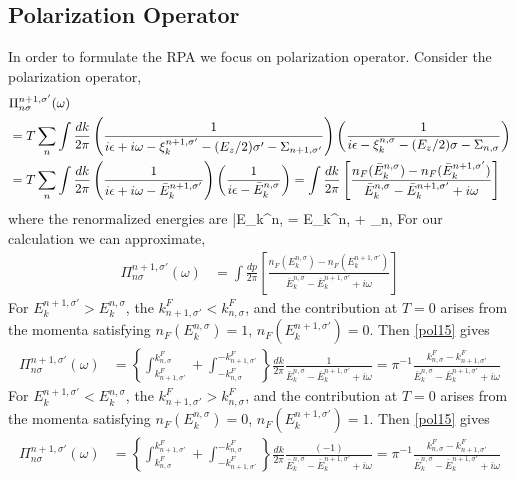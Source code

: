 \subsection{Polarization Operator}
In order to formulate the RPA we focus on polarization operator.
Consider the polarization operator,
\begin{align}\label{pol11}
&\Pi_{n\sigma}^{n+1,\sigma'}(\omega)\\
&= T \sum_n \int \frac{dk}{2 \pi}\left(\frac{ 1 }{ i \epsilon + i \omega - \xi_k^{n+1,\sigma'}- (E_z/2) \sigma'  - \Sigma_{n+1,\sigma'} } \right) 
\left(
\frac{ 1 }{ i \epsilon  - \xi_k^{n,\sigma} - (E_z/2) \sigma - \Sigma_{n,\sigma}} 
\right)
\notag \\
& = 
T \sum_n \int \frac{dk}{2 \pi}\left(\frac{ 1 }{ i \epsilon + i \omega - \bar{E}_k^{n+1,\sigma'}} \right) 
\left(
\frac{ 1 }{ i \epsilon  - \bar{E}_k^{n,\sigma} } 
\right)
=
\int \frac{ d k }{ 2 \pi } 
\left[
\frac{n_F(\bar{E}_k^{n,\sigma}) - n_F(\bar{E}_k^{n+1,\sigma'})  }{\bar{E}_k^{n,\sigma} - \bar{E}_k^{n+1,\sigma'} + i \omega }
\right]
\end{align}
where the renormalized energies are
\be\label{pol13}
\bar{E}_k^{n,\sigma}  = E_k^{n,\sigma}  + \Sigma_{n,\sigma}
\ee 
For our calculation we can approximate,
\begin{align}\label{pol15}
\Pi_{n\sigma}^{n+1,\sigma'}(\omega) &= 
\int \frac{ d p }{ 2 \pi } 
\left[
\frac{n_F(E_k^{n,\sigma}) - n_F(E_k^{n+1,\sigma'})  }{\bar{E}_k^{n,\sigma} - \bar{E}_k^{n+1,\sigma'} + i \omega }
\right]
\end{align}
For $E_k^{n+1,\sigma'} > E_k^{n,\sigma}$, the $k^F_{n+1,\sigma'} < k^F_{n,\sigma}$, and the contribution at $T=0$ arises from the momenta satisfying $n_F(E_k^{n,\sigma}) =1$, $n_F(E_k^{n+1,\sigma'})=0$.
Then \eqref{pol15} gives
\begin{align}\label{pol17}
\Pi_{n\sigma}^{n+1,\sigma'}(\omega) &=
\left\{ \int_{k^F_{n+1,\sigma'} }^{ k^F_{n,\sigma}}  + \int_{-k^F_{n,\sigma} }^{ -k^F_{n+1,\sigma'}} \right\} \frac{ d k }{ 2 \pi }
\frac{ 1 }{ \bar{E}_k^{n,\sigma}- \bar{E}_k^{n+1,\sigma'}   + i \omega}=
%
\pi^{-1} \frac{ k^F_{n,\sigma} - k^F_{n+1,\sigma'} }{ \bar{E}_k^{n,\sigma}- \bar{E}_k^{n+1,\sigma'}   + i \omega}
\end{align}
For $E_k^{n+1,\sigma'} < E_k^{n,\sigma}$, the $k^F_{n+1,\sigma'} > k^F_{n,\sigma}$, and the contribution at $T=0$ arises from the momenta satisfying $n_F(E_k^{n,\sigma}) =0$, $n_F(E_k^{n+1,\sigma'})=1$.
Then \eqref{pol15} gives
\begin{align}\label{pol19}
\Pi_{n\sigma}^{n+1,\sigma'}(\omega) &=
\left\{ \int_{ k^F_{n,\sigma}}^{k^F_{n+1,\sigma'} }  + \int_{ -k^F_{n+1,\sigma'}}^{-k^F_{n,\sigma} } \right\} \frac{ d k }{ 2 \pi }
\frac{ (-1) }{ \bar{E}_k^{n,\sigma}- \bar{E}_k^{n+1,\sigma'}   + i \omega}=
%
\pi^{-1} \frac{ k^F_{n,\sigma} - k^F_{n+1,\sigma'} }{ \bar{E}_k^{n,\sigma}- \bar{E}_k^{n+1,\sigma'}   + i \omega}
\end{align}
